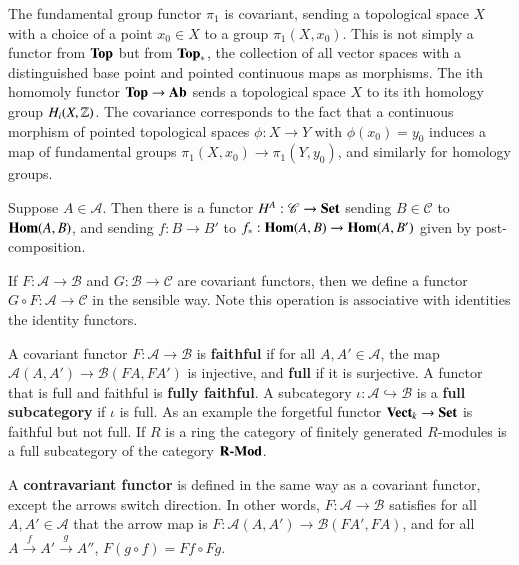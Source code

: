 \begin{example}
    The fundamental group functor $\pi_1$ is covariant, sending a topological space $X$ with a choice of a point $x_0 \in X$ to a group $\pi_1(X,x_0)$. This is not simply a functor from $\normalfont\textbf{Top}$ but from $\normalfont\textbf{Top}_*$, the collection of all vector spaces with a distinguished base point and pointed continuous maps as morphisms. The ith homomoly functor $\normalfont\textbf{Top}\rightarrow \normalfont\textbf{Ab}$ sends a topological space $X$ to its ith homology group $H_i(X,\mathbb Z)$. The covariance corresponds to the fact that a continuous morphism of pointed topological spaces $\phi:X\rightarrow Y$ with $\phi(x_0) = y_0$ induces a map of fundamental groups $\pi_1(X,x_0)\rightarrow \pi_1(Y,y_0)$, and similarly for homology groups.
\end{example}

\begin{example}
    Suppose $A \in \mathscr{A}$. Then there is a functor $H^A:\mathscr{C}\rightarrow \normalfont\textbf{Set}$ sending $B \in \mathscr{C}$ to $\mathbf{Hom}(A,B)$, and sending $f:B\rightarrow B'$ to $f_*:\mathbf{Hom}(A,B)\rightarrow \mathbf{Hom}(A,B')$ given by post-composition.
\end{example}

\begin{definition}
    If $F:\mathscr{A}\rightarrow \mathscr{B}$ and $G:\mathscr{B}\rightarrow \mathscr{C}$ are covariant functors, then we define a functor $G\circ F:\mathscr{A}\rightarrow \mathscr{C}$ in the sensible way. Note this operation is associative with identities the identity functors.
\end{definition}

A covariant functor $F:\mathscr{A}\rightarrow \mathscr{B}$ is \textbf{faithful} if for all $A,A' \in \mathscr{A}$, the map $\mathscr{A}(A,A')\rightarrow \mathscr{B}(FA,FA')$ is injective, and \textbf{full} if it is surjective. A functor that is full and faithful is \textbf{fully faithful}. A subcategory $\iota:\mathscr{A}\hookrightarrow \mathscr{B}$ is a \textbf{full subcategory} if $\iota$ is full. As an example the forgetful functor $\normalfont\textbf{Vect}_{k}\rightarrow \normalfont\textbf{Set}$ is faithful but not full. If $R$ is a ring the category of finitely generated $R$-modules is a full subcategory of the category $\normalfont\textbf{R-Mod}$.

\begin{definition}
    A \textbf{contravariant functor} is defined in the same way as a covariant functor, except the arrows switch direction. In other words, $F:\mathscr{A}\rightarrow \mathscr{B}$ satisfies for all $A,A' \in \mathscr{A}$ that the arrow map is $F:\mathscr{A}(A,A')\rightarrow \mathscr{B}(FA',FA)$, and for all $A\xrightarrow{f}A'\xrightarrow{g}A''$, $F(g\circ f) = Ff\circ Fg$.
\end{definition}

